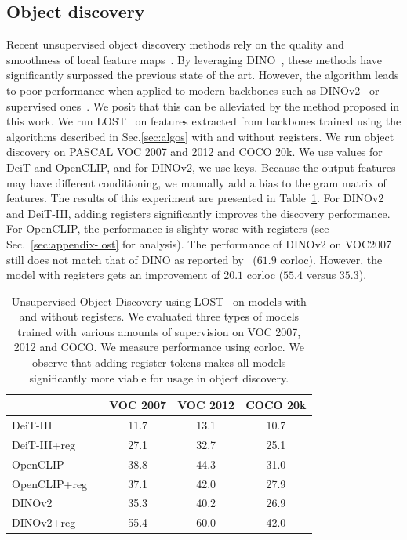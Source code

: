 \documentclass{article} \usepackage{iclr2024_conference,times}
\newcommand{\new}[1]{{#1}}
\newcommand{\old}[1]{}
\begin{document}
\subsection{Object discovery}\label{sec:obj_discovery}
Recent unsupervised object discovery methods rely on the quality and smoothness of local feature maps~\citep{simeoni2021localizing,wang2023cut}.
By leveraging DINO~\cite{caron2021emerging}, these methods \new{have significantly} surpassed the previous state of the art\old{ significantly}. 
However, the algorithm leads to poor performance when applied to modern backbones such as DINOv2~\cite{oquab2023dinov2} or supervised ones~\cite{touvron2022deit}.
We posit that this can be alleviated by the method proposed in this work.
We run LOST~\citep{simeoni2021localizing} on features extracted from backbones trained using the algorithms described in Sec.\ref{sec:algos} with and without registers. 
We run object discovery on PASCAL VOC 2007 and 2012 and COCO 20k.
We use values for DeiT and OpenCLIP, and for DINOv2, we use keys.
Because the output features may have different conditioning, we manually add a bias to the gram matrix of features.
The results of this experiment are presented in Table~\ref{tab:lost}.
For DINOv2 and DeiT-III, adding registers significantly improves the discovery performance. 
For OpenCLIP, the performance is slighty worse with registers (see Sec.~\ref{sec:appendix-lost} for analysis).
The performance of DINOv2 on VOC2007 still does not match that of DINO as reported by~\citet{simeoni2021localizing} ($61.9$ corloc).
However, the model with registers gets an improvement of $20.1$ corloc ($55.4$ versus $35.3$).

\begin{table}[t]
  \centering
  \begin{tabular}{@{}l c ccc@{}}
  	\toprule
  	            && VOC 2007 & VOC 2012  & COCO 20k \\
  	\midrule
    DeiT-III      && 11.7 & 13.1 & 10.7 \\
    DeiT-III+reg  && 27.1 & 32.7 & 25.1 \\
    \midrule
    OpenCLIP      && \new{38.8} & \new{44.3} & \new{31.0} \\
    OpenCLIP+reg  && \new{37.1} & \new{42.0} & \new{27.9} \\
    \midrule
    DINOv2        && 35.3 & 40.2 & 26.9 \\
    DINOv2+reg    && 55.4 & 60.0 & 42.0 \\
  	\bottomrule
  \end{tabular}
  \caption{
    Unsupervised Object Discovery using LOST~\citep{simeoni2021localizing} on models with and without registers.
    We evaluated three types of models trained with various amounts of supervision on VOC 2007, 2012 and COCO.
    We measure performance using corloc.
    We observe that adding register tokens makes all models significantly more viable for usage in object discovery.
  }  
  \label{tab:lost}
\end{table}
\end{document}
